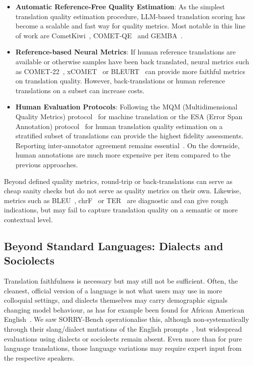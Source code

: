 \begin{itemize}
    \item \textbf{Automatic Reference-Free Quality Estimation}: As the simplest translation quality estimation procedure, LLM-based translation scoring has become a scalable and fast way for quality metrics. Most notable in this line of work are CometKiwi~\cite{rei-etal-2022-cometkiwi, rei-etal-2023-scaling}, COMET-QE~\cite{chimoto-bassett-2022-comet} and GEMBA~\cite{kocmi-federmann-2023-gemba}. 
    \item \textbf{Reference-based Neural Metrics}: If human reference translations are available or otherwise samples have been back translated, neural metrics such as COMET-22~\cite{rei-etal-2022-comet}, xCOMET~\cite{guerreiro-etal-2024-xcomet} or BLEURT~\cite{sellam-etal-2020-bleurt} can provide more faithful metrics on translation quality. However, back-translations or human reference translations on a subset can increase costs. 
    \item \textbf{Human Evaluation Protocols}: Following the MQM (Multidimensional Quality Metrics) protocol~\cite{freitag-etal-2021-experts} for machine translation or the ESA (Error Span Annotation) protocol~\cite{kocmi-etal-2024-error} for human translation quality estimation on a stratified subset of translations can provide the highest fidelity assessments. Reporting inter-annotator agreement remains essential~\cite{gwet2001handbook}. On the downside, human annotations are much more expensive per item compared to the previous approaches. 
\end{itemize}

Beyond defined quality metrics, round-trip or back-translations can serve as cheap sanity checks but do not serve as quality metrics on their own. Likewise, metrics such as BLEU~\cite{papineni-etal-2002-bleu}, chrF~\cite{popovic-2015-chrf} or TER~\cite{snover-etal-2006-study} are diagnostic and can give rough indications, but may fail to capture translation quality on a semantic or more contextual level. 

\subsection{Beyond Standard Languages: Dialects and Sociolects}
Translation faithfulness is necessary but may still not be sufficient. Often, the cleanest, official version of a language is not what users may use in more colloquial settings, and dialects themselves may carry demographic signals changing model behaviour, as has for example been found for African American English~\cite{hofmann2024ai-e4f}. We saw SORRY-Bench operationalise this, although non-systematically through their slang/dialect mutations of the English prompts~\cite{xie2025sorrybench}, but widespread evaluations using dialects or sociolects remain absent. Even more than for pure language translations, those language variations may require expert input from the respective speakers. 
\\


